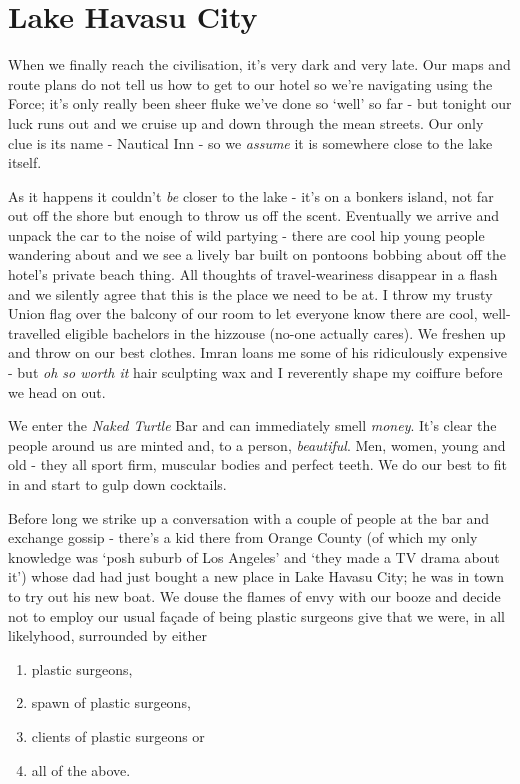 \documentclass[a5paper,titlepage,draft]{book}
\begin{document}
\section*{Lake Havasu City}
When we finally reach the civilisation, it's very dark and very late.  Our maps and route plans do not tell us how to get to our hotel so we're navigating using the Force; it's only really been sheer fluke we've done so `well' so far - but tonight our luck runs out and we cruise up and down through the mean streets.  Our only clue is its name - Nautical Inn - so we \emph{assume} it is somewhere close to the lake itself.

As it happens it couldn't \emph{be} closer to the lake - it's on a bonkers island, not far out off the shore but enough to throw us off the scent.  Eventually we arrive and unpack the car to the noise of wild partying - there are cool hip young people wandering about and we see a lively bar built on pontoons bobbing about off the hotel's private beach thing.  All thoughts of travel-weariness disappear in a flash and we silently agree that this is the place we need to be at.  I throw my trusty Union flag over the balcony of our room to let everyone know there are cool, well-travelled eligible bachelors in the hizzouse (no-one actually cares).  We freshen up and throw on our best clothes.  Imran loans me some of his ridiculously expensive - but \emph{oh so worth it} hair sculpting wax and I reverently shape my coiffure before we head on out.

We enter the \emph{Naked Turtle} Bar and can immediately smell \emph{money}.  It's clear the people around us are minted and, to a person, \emph{beautiful}.  Men, women, young and old - they all sport firm, muscular bodies and perfect teeth.  We do our best to fit in and start to gulp down cocktails.

Before long we strike up a conversation with a couple of people at the bar and exchange gossip - there's a kid there from Orange County (of which my only knowledge was `posh suburb of Los Angeles' and `they made a TV drama about it') whose dad had just bought a new place in Lake Havasu City; he was in town to try out his new boat.  We douse the flames of envy with our booze and decide not to employ our usual fa\c{c}ade of being plastic surgeons give that we were, in all likelyhood, surrounded by either
\begin{enumerate}
\item plastic surgeons,
\item spawn of plastic surgeons,
\item clients of plastic surgeons or
\item all of the above.
\end{enumerate}
\end{document}
